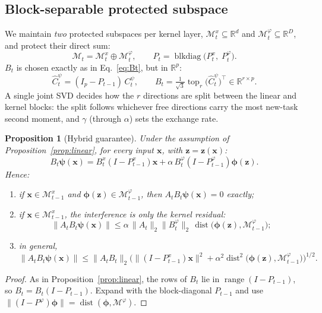 \documentclass[11pt]{article}
\theoremstyle{plain}
\newtheorem{proposition}{Proposition}
\theoremstyle{definition}
\theoremstyle{remark}
\newcommand{\R}{\mathbb{R}}
\newcommand{\M}{\mathcal{M}}
\newcommand{\range}{\operatorname{range}}
\newcommand{\blkdiag}{\operatorname{blkdiag}}
\newcommand{\dist}{\operatorname{dist}}
\newcommand{\topr}{\operatorname{top}_r}
\newcommand{\x}{\bm{x}}
\newcommand{\z}{\bm{z}}
\newcommand{\vphi}{\bm{\phi}}
\newcommand{\vpsi}{\bm{\psi}}
\begin{document}
\subsection{Block-separable protected subspace}
We maintain \emph{two} protected subspaces per kernel layer, $\M^x_t\subseteq\R^d$ and $\M^\varphi_t\subseteq\R^D$, and protect their direct sum:
\begin{equation}\label{eq:blockP}
\M_t=\M^x_t\oplus\M^\varphi_t,\qquad P_t=\blkdiag\big(P^x_t,\;P^\varphi_t\big).
\end{equation}
$B_t$ is chosen exactly as in Eq.~\eqref{eq:Bt}, but in $\R^{p}$:
\begin{equation}\label{eq:kBt}
\widehat C^{\psi}_t=(I_p-P_{t-1})\,C^{\psi}_t,\qquad B_t=\tfrac1{\sqrt3}\topr\big(\widehat C^{\psi}_t\big)^{\top}\in\R^{r\times p}.
\end{equation}
A single joint SVD decides how the $r$ directions are split between the linear and kernel blocks: the split follows whichever free directions carry the most new-task second moment, and $\gamma$ (through $\alpha$) sets the exchange rate.

\begin{proposition}[Hybrid guarantee]\label{prop:hybrid}
Under the assumption of Proposition~\ref{prop:linear}, for every input $\x$, with $\z=\z(\x)$:
\begin{equation}\label{eq:hybridbound}
B_t\vpsi(\x)=B^x_t(I-P^x_{t-1})\x+\alpha\,B^\varphi_t(I-P^\varphi_{t-1})\vphi(\z).
\end{equation}
Hence:
\begin{enumerate}[label=(\roman*),nosep]
\item if $\x\in\M^x_{t-1}$ and $\vphi(\z)\in\M^\varphi_{t-1}$, then $A_tB_t\vpsi(\x)=0$ exactly;
\item if $\x\in\M^x_{t-1}$, the interference is \emph{only} the kernel residual:
\[
\|A_tB_t\vpsi(\x)\|\le\alpha\,\|A_t\|_2\|B^\varphi_t\|_2\,\dist\big(\vphi(\z),\M^\varphi_{t-1}\big);
\]
\item in general,
\[
\|A_tB_t\vpsi(\x)\|\le\|A_tB_t\|_2\Big(\|(I-P^x_{t-1})\x\|^2+\alpha^2\dist^2\big(\vphi(\z),\M^\varphi_{t-1}\big)\Big)^{1/2}.
\]
\end{enumerate}
\end{proposition}
\begin{proof}
As in Proposition~\ref{prop:linear}, the rows of $B_t$ lie in $\range(I-P_{t-1})$, so $B_t=B_t(I-P_{t-1})$. Expand with the block-diagonal $P_{t-1}$ and use $\|(I-P^\varphi)\vphi\|=\dist(\vphi,\M^\varphi)$.
\end{proof}
\end{document}
